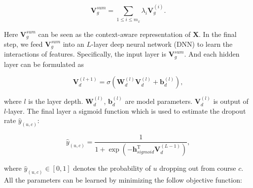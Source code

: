 \begin{equation}
\mathbf{V}^{sum}_g = \sum_{1 \leq i \leq m_x} \lambda_i \mathbf{V}^{(i)}_g.
\end{equation}
	
Here $\mathbf{V}^{sum}_g$ can be seen as the context-aware representation of $\mathbf{X}$. In the final step, we feed $\mathbf{V}_g^{sum}$ into an $L$-layer deep neural network (DNN) to learn the interactions of features. Specifically, the input layer is  $\mathbf{V}_g^{sum}$. And each hidden layer can be formulated as

\begin{equation}
\mathbf{V}_{d}^{(l+1)} = \sigma(\mathbf{W}_{d}^{(l)} \mathbf{V}_{d}^{(l)} + \mathbf{b}_{d}^{(l)} )
,
\end{equation}

\noindent where $l$ is the layer depth.  $\mathbf{W}_{d}^{(l)}$, $\mathbf{b}_{d}^{(l)}$ are model parameters. $\mathbf{V}_{d}^{(l)} $ is output of $l$-layer. The final layer a sigmoid function which is used to estimate the dropout rate $\hat{y}_{(u,c)}$:

\begin{equation}
\hat{y}_{(u,c)} = \frac{1}{1+\exp(-\mathbf{h}_{sigmoid}^{\mathrm{T}} \mathbf{V}^{(L-1)}_d)},
\end{equation}

\noindent where $\hat{y}_{(u,c)} \in [0,1]$ denotes the probability of $u$ dropping out from course $c$.
All the parameters can be learned by minimizing the follow objective function:

